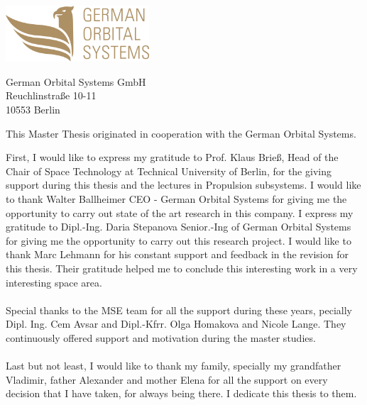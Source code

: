 \thispagestyle{empty}
\vspace*{3cm}


\begin{center}
\includegraphics[width=0.4\textwidth]{logo.png}
\end{center}

\vspace*{0.2cm}

\begin{center}
German Orbital Systems GmbH\\
Reuchlinstraße 10-11\\
10553 Berlin\\
\end{center}
\vspace*{0.5cm}

\noindent This Master Thesis originated in cooperation with the German Orbital Systems.

\vspace*{1cm}
\noindent 
First, I would like to express my gratitude to Prof. Klaus Brieß, Head of the Chair of Space
Technology at Technical University of Berlin, for the giving support during this thesis and
the lectures in Propulsion subsystems.
I would like to thank Walter Ballheimer CEO - German Orbital Systems for giving me the opportunity to carry out state of the art research in this company. I express my gratitude to Dipl.-Ing. Daria Stepanova Senior.-Ing of German Orbital Systems for giving me
the opportunity to carry out this research project. I would like to thank Marc Lehmann for his constant support and feedback in the revision  for this thesis. Their gratitude helped me to conclude this interesting work in a very interesting space area.
\\
\\
Special thanks to the MSE team for all the support during these years,  pecially Dipl.
Ing. Cem Avsar and Dipl.-Kfrr. Olga Homakova and Nicole Lange. They continuously offered support and
motivation during the master studies.
\\
\\
Last but not least, I would like to thank my family, specially my grandfather Vladimir, father Alexander
and mother Elena for all the support on every decision that I have taken, for always being
there. I dedicate this thesis to them.